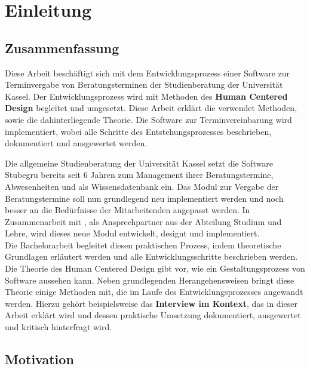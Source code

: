 \section{Einleitung}

\subsection{Zusammenfassung}

Diese Arbeit beschäftigt sich mit dem Entwicklungsprozess einer Software zur
Terminvergabe von Beratungsterminen der Studienberatung der Universität Kassel.
Der Entwicklungsprozess wird mit Methoden des \textbf{Human Centered Design}
begleitet und umgesetzt. Diese Arbeit erklärt die verwendet Methoden, sowie die
dahinterliegende Theorie. Die Software zur Terminvereinbarung wird
implementiert, wobei alle Schritte des Entstehungsprozesses beschrieben,
dokumentiert und ausgewertet werden.

Die allgemeine Studienberatung der Universität Kassel setzt die Software
Stubegru bereits seit 6 Jahren zum Management ihrer Beratungstermine,
Abwesenheiten und als Wissensdatenbank ein. Das Modul zur Vergabe der
Beratungstermine soll nun grundlegend neu implementiert werden und noch besser
an die Bedürfnisse der Mitarbeitenden angepasst werden. In Zusammenarbeit mit
\ipName, als Ansprechpartner aus der Abteilung Studium und Lehre, wird dieses
neue Modul entwickelt, designt und implementiert.\\ Die Bachelorarbeit
begleitet diesen praktischen Prozess, indem theoretische Grundlagen erläutert
werden und alle Entwicklungsschritte beschrieben werden. Die Theorie des Human
Centered Design gibt vor, wie ein Gestaltungsprozess von Software aussehen
kann. Neben grundlegenden Herangehensweisen bringt diese Theorie einige
Methoden mit, die im Laufe des Entwicklungsprozesses angewandt werden. Hierzu
gehört beispielsweise das \textbf{Interview im Kontext}, das in dieser Arbeit
erklärt wird und dessen praktische Umsetzung dokumentiert, ausgewertet und
kritisch hinterfragt wird.

\subsection{Motivation}

